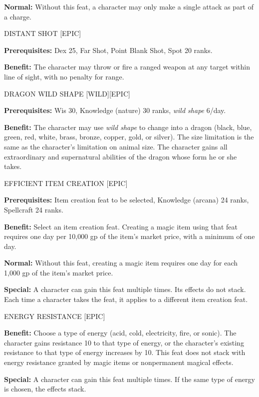 \documentclass{article}
\begin{document}
\textbf{Normal:} Without this feat, a character may only make a single attack as 
part of a charge. 

\vspace{12pt}
DISTANT SHOT [EPIC]

\textbf{Prerequisites:} Dex 25, Far Shot, Point Blank Shot, Spot 20 ranks. 

\textbf{Benefit:} The character may throw or fire a ranged weapon at any target 
within line of sight, with no penalty for range. 

\vspace{12pt}
DRAGON WILD SHAPE [WILD][EPIC]

\textbf{Prerequisites:} Wis 30, Knowledge (nature) 30 ranks, \textit{wild shape 
}6/day. 

\textbf{Benefit:} The character may use \textit{wild shape }to change into a dragon 
(black, blue, green, red, white, brass, bronze, copper, gold, or silver). The size 
limitation is the same as the character's limitation on animal size. The character 
gains all extraordinary and supernatural abilities of the dragon whose form he 
or she takes. 

\vspace{12pt}
EFFICIENT ITEM CREATION [EPIC] 

\textbf{Prerequisites:} Item creation feat to be selected, Knowledge (arcana) 24 
ranks, Spellcraft 24 ranks. 

\textbf{Benefit:} Select an item creation feat. Creating a magic item using that 
feat requires one day per 10,000 gp of the item's market price, with a minimum 
of one day. 

\textbf{Normal:} Without this feat, creating a magic item requires one day for 
each 1,000 gp of the item's market price.

\textbf{Special:} A character can gain this feat multiple times. Its effects do 
not stack. Each time a character takes the feat, it applies to a different item 
creation feat. 

\vspace{12pt}
ENERGY RESISTANCE [EPIC] 

\textbf{Benefit:} Choose a type of energy (acid, cold, electricity, fire, or sonic). 
The character gains resistance 10 to that type of energy, or the character's existing 
resistance to that type of energy increases by 10. This feat does not stack with 
energy resistance granted by magic items or nonpermanent magical effects. 

\textbf{Special:} A character can gain this feat multiple times. If the same type 
of energy is chosen, the effects stack. 
\end{document}
